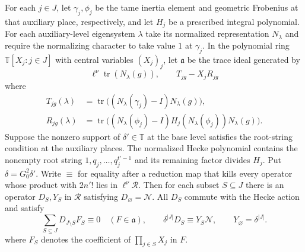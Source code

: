 \begin{lemma}
\label{lem:c-deformed-norm}
\emitthmsource
For each $j\in J$, let $\gamma_j,\phi_j$ be the tame inertia element and geometric Frobenius at that auxiliary place, respectively, and let $H_j$ be a prescribed integral polynomial.
For each auxiliary-level eigensystem $\lambda$ take its normalized representation $N_\lambda$ and require the normalizing character to take value $1$ at $\gamma_j$.
In the polynomial ring $\mathbb T[X_j:j\in J]$ with central variables $(X_j)_j$, let $\mathfrak a$ be the trace ideal generated by
\[
 \ell^\nu\operatorname{tr}(N_\lambda(g)),
 \qquad T_{jg}-X_j R_{jg}
\]
where
\[
\begin{aligned}
 T_{jg}(\lambda)&=\operatorname{tr}\bigl((N_\lambda(\gamma_j)-I)N_\lambda(g)\bigr),\\
 R_{jg}(\lambda)&=\operatorname{tr}\bigl((N_\lambda(\phi_j)-I)
 H_j(N_\lambda(\phi_j))N_\lambda(g)\bigr).
\end{aligned}
\]
Suppose the nonzero support of $\delta'\in\mathbb T$ at the base level satisfies the root-string condition at the auxiliary places. The normalized Hecke polynomial contains the nonempty root string $1,q_j,\ldots,q_j^{t'-1}$ and its remaining factor divides $H_j$.
Put $\delta=G_0^2\delta'$. Write $\equiv$ for equality after a reduction map that kills every operator whose product with $2n'!$ lies in $\ell^\nu\mathcal R$.
Then for each subset $S\subseteq J$ there is an operator $D_S,Y_S$ in $\mathcal R$ satisfying $D_\varnothing=\mathcal N$. All $D_S$ commute with the Hecke action and satisfy
\[
 \sum_{S\subseteq J}D_{J\setminus S}F_S\equiv0\quad(F\in\mathfrak a),
 \qquad
 \delta^{|J|}D_S\equiv Y_S\mathcal N,\qquad
 Y_\varnothing=\delta^{|J|}.
\]
where $F_S$ denotes the coefficient of $\prod_{j\in S}X_j$ in $F$.
\end{lemma}
